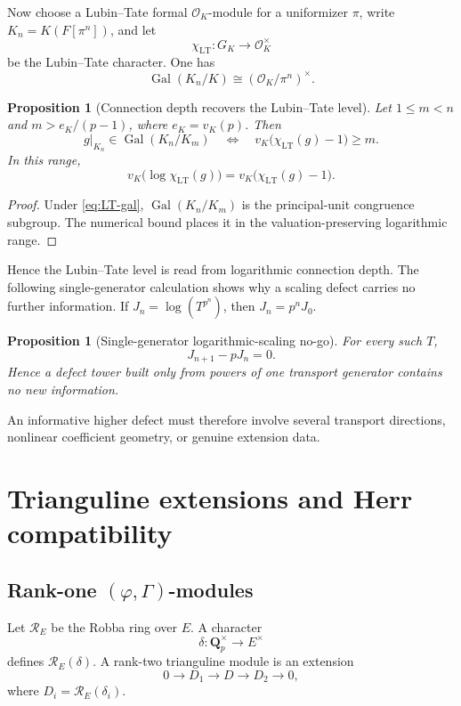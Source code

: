 \documentclass[11pt]{article}
\newtheorem{proposition}[theorem]{Proposition}
\theoremstyle{definition}
\newcommand{\Qp}{\mathbf Q_p}
\newcommand{\OK}{\mathcal O_K}
\newcommand{\Gal}{\operatorname{Gal}}
\newcommand{\cR}{\mathcal R}
\begin{document}
Now choose a Lubin--Tate formal $\OK$-module for a uniformizer $\pi$, write $K_n=K(F[\pi^n])$, and let
\[
\chi_{\mathrm{LT}}:G_K\longrightarrow\OK^\times
\]
be the Lubin--Tate character.  One has
\begin{equation}\label{eq:LT-gal}
\Gal(K_n/K)\cong(\OK/\pi^n)^\times.
\end{equation}

\begin{proposition}[Connection depth recovers the Lubin--Tate level]\label{prop:LT-depth}
Let $1\le m<n$ and $m>e_K/(p-1)$, where $e_K=v_K(p)$.  Then
\[
g|_{K_n}\in\Gal(K_n/K_m)
\quad\Longleftrightarrow\quad
v_K\bigl(\chi_{\mathrm{LT}}(g)-1\bigr)\ge m.
\]
In this range,
\[
v_K\bigl(\log\chi_{\mathrm{LT}}(g)\bigr)
=v_K\bigl(\chi_{\mathrm{LT}}(g)-1\bigr).
\]
\end{proposition}

\begin{proof}
Under \eqref{eq:LT-gal}, $\Gal(K_n/K_m)$ is the principal-unit congruence subgroup.  The numerical bound places it in the valuation-preserving logarithmic range.
\end{proof}

Hence the Lubin--Tate level is read from logarithmic connection depth.  The following single-generator calculation shows why a scaling defect carries no further information.  If $J_n=\log(T^{p^n})$, then $J_n=p^nJ_0$.

\begin{proposition}[Single-generator logarithmic-scaling no-go]\label{prop:rank1-nogo}
For every such $T$,
\[
J_{n+1}-pJ_n=0.
\]
Hence a defect tower built only from powers of one transport generator contains no new information.
\end{proposition}

An informative higher defect must therefore involve several transport directions, nonlinear coefficient geometry, or genuine extension data.

\section{Trianguline extensions and Herr compatibility}

\subsection{Rank-one \texorpdfstring{$(\varphi,\Gamma)$}{(phi,Gamma)}-modules}

Let $\cR_E$ be the Robba ring over $E$.  A character
\[
\delta:\Qp^\times\longrightarrow E^\times
\]
defines $\cR_E(\delta)$.  A rank-two trianguline module is an extension \cite{ColmezTrianguline,BergerTrianguline}
\begin{equation}\label{eq:trianguline-extension}
0\longrightarrow D_1\longrightarrow D\longrightarrow D_2\longrightarrow0,
\end{equation}
where $D_i=\cR_E(\delta_i)$.
\end{document}

